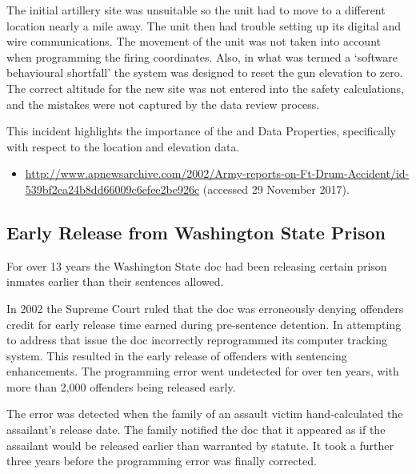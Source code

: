 The initial artillery site was unsuitable so the unit had to move to a different location nearly a mile away. The unit then had trouble setting up its digital and wire communications. The movement of the unit was not taken into account when programming the firing coordinates. Also, in what was termed a `software behavioural shortfall' the system was designed to reset the gun elevation to zero. The correct altitude for the new site was not entered into the safety calculations, and the mistakes were not captured by the data review process.

This incident highlights the importance of the  and  Data Properties, specifically with respect to the location and elevation data.

\begin{itemize}
	\item \raggedright{\href{http://www.apnewsarchive.com/2002/Army-reports-on-Ft-Drum-Accident/id-539bf2ea24b8dd66009c6efee2be926c}{http://www.apnewsarchive.com/2002/Army-reports-on-Ft-Drum-Accident/id- 539bf2ea24b8dd66009c6efee2be926c} (accessed 29 November 2017).}
\end{itemize}


\subsection{Early Release from Washington State Prison} \label{bkm:incacc:washprison}
For over 13 years the Washington State \gls{doc} had been releasing certain prison inmates earlier than their sentences allowed.

In 2002 the Supreme Court ruled that the \gls{doc} was erroneously denying offenders credit for early release time earned during pre-sentence detention. In attempting to address that issue the \gls{doc} incorrectly reprogrammed its computer tracking system. This resulted in the early release of offenders with sentencing enhancements. The programming error went undetected for over ten years, with more than 2,000 offenders being released early.

The error was detected when the family of an assault victim hand-calculated the assailant's release date. The family notified the \gls{doc} that it appeared as if the assailant would be released earlier than warranted by statute. It took a further three years before the programming error was finally corrected.

